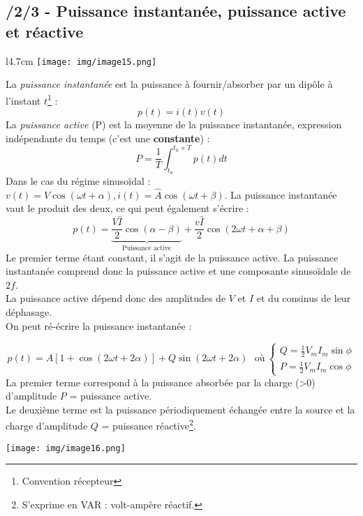 \documentclass	[11pt, a4paper, openany]{book}
\begin{document}
\subsection{/2/3 - Puissance instantanée, puissance active et réactive}
\begin{wrapfigure}[7]{l}{4.7cm}
\texttt{[image: img/image15.png]}
\end{wrapfigure}
La \textit{puissance instantanée} est la puissance à fournir/absorber par un dipôle à l'instant $t$\footnote{Convention récepteur} :
\begin{equation}
p(t) = i(t)v(t)
\end{equation}
La \textit{puissance active} (P) est la moyenne de la puissance instantanée, expression indépendante du temps (c'est une \textbf{constante}) :
\begin{equation}
P = \frac{1}{T}\int_{t_0}^{t_0+T} p(t) dt
\end{equation}
Dans le cas du régime sinusoïdal : $v(t) = V\cos(\omega t + \alpha), i(t) = \hat A\cos(\omega t + \beta)$. La puissance instantanée vaut le produit des deux, ce qui peut également s'écrire :
\begin{equation}
p(t) = \underbrace{\frac{V\hat I}{2}\cos(\alpha - \beta)}_{\text{Puissance active}} + \frac{v\hat I}{2}\cos(2\omega t + \alpha + \beta)
\end{equation}
Le premier terme étant constant, il s'agit de la puissance active. La puissance instantanée comprend donc la puissance active et une composante sinusoïdale de $2f$.\\
La puissance active dépend donc des amplitudes de $V$ et $I$ et du consinus de leur déphasage.\\

On peut ré-écrire la puissance instantanée : 





\begin{equation}
p(t) = A[1 + \cos(2\omega t + 2\alpha)] + Q \sin(2\omega t + 2\alpha)\ \ \ \text{où}\ \left\{\begin{array}{l}
Q = \frac{1}{2}V_mI_m\sin\phi\\
P = \frac{1}{2}V_mI_m\cos\phi
\end{array}\right.
\end{equation}
La premier terme correspond à la puissance absorbée par la charge (>0) d'amplitude $P$ = puissance active.\\
Le deuxième terme est la puissance périodiquement échangée entre la source et la charge d'amplitude $Q$ = puissance réactive\footnote{S'exprime en VAR : volt-ampère réactif.}.
\begin{center}
\texttt{[image: img/image16.png]}
\end{center}
\end{document}
